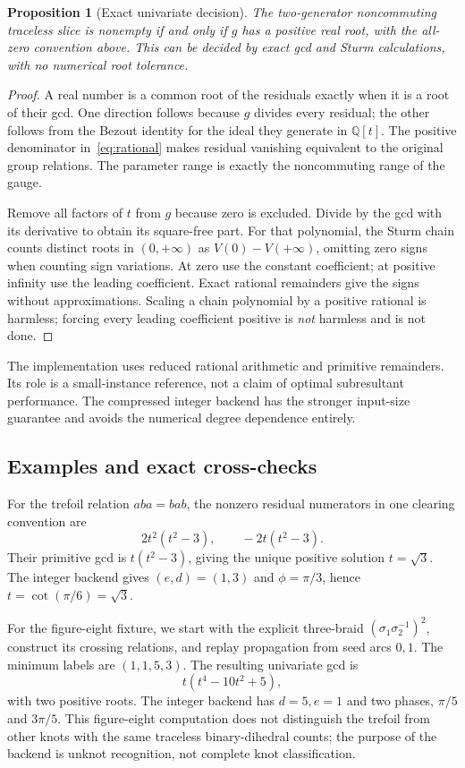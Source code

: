 \documentclass[11pt]{article}
\newtheorem{proposition}[theorem]{Proposition}
\theoremstyle{definition}
\theoremstyle{remark}
\newcommand{\QQ}{\mathbb Q}
\begin{document}
\begin{proposition}[Exact univariate decision]
The two-generator noncommuting traceless slice is nonempty if and only if $g$ has a positive real root, with the all-zero convention above. This can be decided by exact gcd and Sturm calculations, with no numerical root tolerance.
\end{proposition}
\begin{proof}
A real number is a common root of the residuals exactly when it is a root of their gcd. One direction follows because $g$ divides every residual; the other follows from the Bezout identity for the ideal they generate in $\QQ[t]$. The positive denominator in~\eqref{eq:rational} makes residual vanishing equivalent to the original group relations. The parameter range is exactly the noncommuting range of the gauge.

Remove all factors of $t$ from $g$ because zero is excluded. Divide by the gcd with its derivative to obtain its square-free part. For that polynomial, the Sturm chain counts distinct roots in $(0,+\infty)$ as $V(0)-V(+\infty)$, omitting zero signs when counting sign variations. At zero use the constant coefficient; at positive infinity use the leading coefficient. Exact rational remainders give the signs without approximations. Scaling a chain polynomial by a positive rational is harmless; forcing every leading coefficient positive is \emph{not} harmless and is not done.
\end{proof}

The implementation uses reduced rational arithmetic and primitive remainders. Its role is a small-instance reference, not a claim of optimal subresultant performance. The compressed integer backend has the stronger input-size guarantee and avoids the numerical degree dependence entirely.

\subsection{Examples and exact cross-checks}
For the trefoil relation $aba=bab$, the nonzero residual numerators in one clearing convention are
\[
2t^2(t^2-3),\qquad -2t(t^2-3).
\]
Their primitive gcd is $t(t^2-3)$, giving the unique positive solution $t=\sqrt3$. The integer backend gives $(e,d)=(1,3)$ and $\phi=\pi/3$, hence $t=\cot(\pi/6)=\sqrt3$.

For the figure-eight fixture, we start with the explicit three-braid $(\sigma_1\sigma_2^{-1})^2$, construct its crossing relations, and replay propagation from seed arcs $0,1$. The minimum labels are $(1,1,5,3)$. The resulting univariate gcd is
\[
t(t^4-10t^2+5),
\]
with two positive roots. The integer backend has $d=5,e=1$ and two phases, $\pi/5$ and $3\pi/5$. This figure-eight computation does not distinguish the trefoil from other knots with the same traceless binary-dihedral counts; the purpose of the backend is unknot recognition, not complete knot classification.
\end{document}
